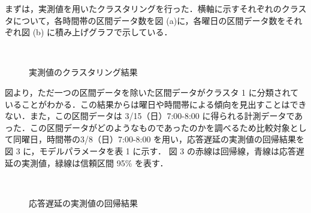\documentclass[a4j]{jarticle}
\begin{document}
まずは，実測値を用いたクラスタリングを行った．横軸に示すそれぞれのクラスタについて，各時間帯の区間データ数を図 (a)に，各曜日の区間データ数をそれぞれ図 (b) に積み上げグラフで示している．
\begin{figure}[tb]
\begin{center}
~
\\
\caption{実測値のクラスタリング結果}
\label{norm}
\end{center}
\end{figure}
図より，ただ一つの区間データを除いた区間データがクラスタ 1 に分類されていることがわかる．この結果からは曜日や時間帯による傾向を見出すことはできない．また，この区間データは 3/15（日）7:00-8:00 に得られる計測データであった．この区間データがどのようなものであったのかを調べるため比較対象として同曜日，時間帯の3/8（日）7:00-8:00 を用い，応答遅延の実測値の回帰結果を図 3 に，モデルパラメータを表 1 に示す．
図 3 の赤線は回帰線，青線は応答遅延の実測値，緑線は信頼区間 95\% を表す．
\begin{figure}[tb]
\begin{center}
~
\caption{応答遅延の実測値の回帰結果}
\end{center}
\end{figure}
\end{document}
